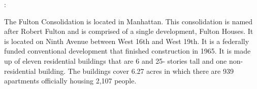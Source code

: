 :     

   

The Fulton Consolidation is located in Manhattan. This consolidation is named after Robert Fulton and is comprised of a single development, Fulton Houses. It is located on Ninth Avenue between West 16th and West 19th. It is a federally funded conventional development that finished construction in 1965. It is made up of eleven residential buildings that are 6 and 25- stories tall and one non-residential building. The buildings cover 6.27 acres in which there are 939 apartments officially housing 2,107 people. 